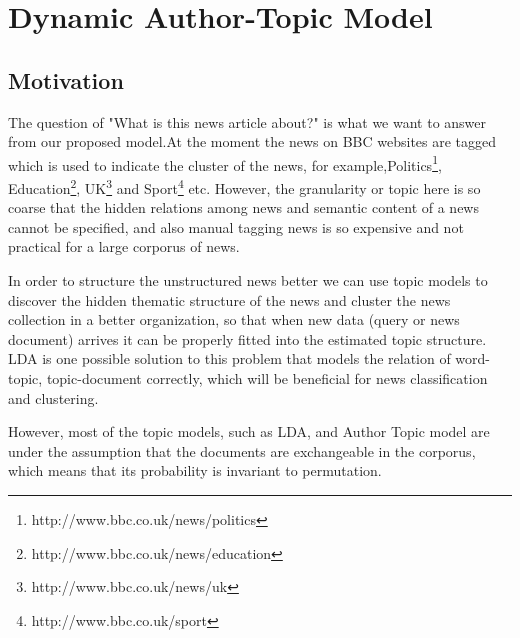 \chapter{Dynamic Author-Topic Model}
\label{chapterlabel3}

\section{Motivation}

The question of "What is this news article about?" is what we want to answer from our proposed model.At the moment the news on BBC websites are tagged which is used to indicate the cluster of the news, for example,Politics\footnote{http://www.bbc.co.uk/news/politics}, Education\footnote{http://www.bbc.co.uk/news/education}, UK\footnote{http://www.bbc.co.uk/news/uk} and Sport\footnote{http://www.bbc.co.uk/sport} etc. However, the granularity or topic here is so coarse that the hidden relations among news and semantic content of a news cannot be specified, and also manual tagging news is so expensive and not practical for a large corporus of news. 

In order to structure the unstructured news better we can use topic models to discover the hidden thematic 
structure of the news and cluster the news collection in a better organization, so that when new data (query or news document) arrives it can be properly fitted into the estimated topic structure. LDA is one possible solution to this problem that models the relation of word-topic, topic-document correctly, which will be beneficial for news classification and clustering. 

However, most of the topic models, such as LDA, and Author Topic model are under the assumption that the documents are exchangeable in the corporus, which means that its probability is invariant to permutation. 

